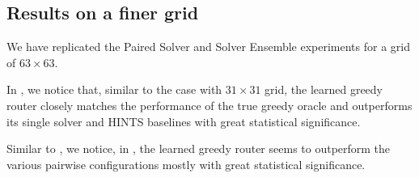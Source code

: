 \documentclass{article}
\begin{document}
\subsection{Results on a finer grid} \label{sec:finer_grids}

We have replicated the Paired Solver and Solver Ensemble experiments for a grid of $63 \times 63$. 

In , we notice that, similar to the case with $31 \times 31$ grid, the learned greedy router closely matches the performance of the true greedy oracle and outperforms its single solver and HINTS baselines with great statistical significance. 

Similar to , we notice, in , the learned greedy router seems to outperform the various pairwise configurations mostly with great statistical significance. 
\end{document}
